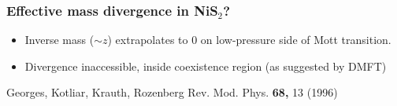 \begin{frame}[label=QONiS2-2]
\frametitle{Effective mass divergence in NiS$_2$?}
\vspace{0.5em}

\centerline{}
\begin{itemize}
\item<1->
Inverse mass ($\sim z$) extrapolates to 0 on low-pressure side of Mott
transition.
\item<visible@2->
Divergence inaccessible, inside coexistence region (as suggested by DMFT)

\end{itemize}

\vspace*{\fill}
\vspace{-0.25em}
\centerline{\makebox[\linewidth]{\rule{0.85\textwidth}{0.4pt}}}
\centerline{\scriptsize Georges, Kotliar, Krauth, Rozenberg
  Rev. Mod. Phys. {\bf 68,} 13 (1996)}
\end{frame}



